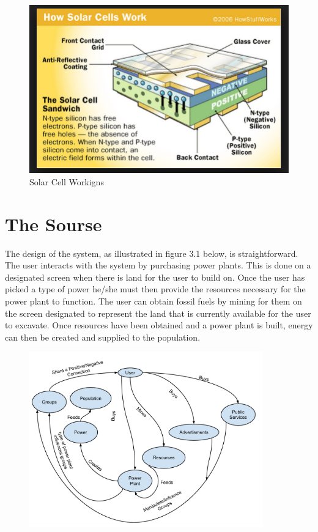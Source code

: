 \documentclass[msc,oneside]{ubcthesis}%
\begin{document}
\begin{figure}[hbt]\label{solarCell}
  \begin{center}
    \includegraphics[width=1\textwidth]{solar}
    \caption[Solar Cell Workings]{ Solar Cell Workigns}
  \end{center}
\end{figure}

\newpage

\chapter{The Sourse}

The design of the system, as illustrated in figure 3.1 below, is straightforward. The user interacts with 
the system by purchasing power plants. This is done on a designated screen when there is land for the user 
to build on. Once the user has picked a type of power he/she must then provide the resources necessary for 
the power plant to function. The user can obtain fossil fuels by mining for them on the screen designated 
to represent the land that is currently available for the user to excavate. Once resources have been 
obtained and a power plant is built, energy can then be created and supplied to the population.
\bigskip

\begin{figure}[hbt]
  \begin{center}
    \includegraphics[width=0.9\textwidth]{DFDDiagram}
    \caption[Figure 1]{\label{DFD Diagram} }
  \end{center}
\end{figure}
\end{document}
